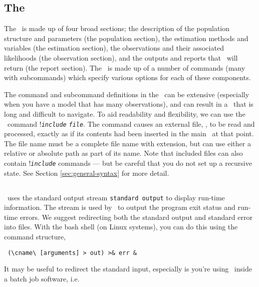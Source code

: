 \subsection{The \config\label{sec:config-files}}
\CH
The \config\ is made up of four broad sections; the description of the population structure and parameters (the population section), the estimation methods and variables (the estimation section), the observations and their associated likelihoods (the observation section), and the outputs and reports that \CNAME\ will return (the report section). The \config\ is made up of a number of commands (many with subcommands) which specify various options for each of these components.

The command and subcommand definitions in the \config\ can be extensive (especially when you have a model that has many observations), and can result in a \config\ that is long and difficult to navigate. To aid readability and flexibility, we can use the \config\ command !\texttt{\emph{include}} \texttt{\emph{file}}. The command causes an external file, , to be read and processed, exactly as if its contents had been inserted in the main \config\ at that point. The file name must be a complete file name with extension, but can use either a relative or absolute path as part of its name. Note that included files can also contain !\texttt{\emph{include}} commands --- but be careful that you do not set up a recursive state. See Section \ref{sec:general-syntax} for more detail.

\subsection{\label{sec:redirecting-stdout}}
\CH
\CNAME\ uses the standard output stream \texttt{standard output} to display run-time information. The  stream is used by \CNAME\ to output the program exit status and run-time errors. We suggest redirecting both the standard output and standard error into files. With the bash shell (on Linux systems), you can do this using the command structure,

\begin{verbatim} (\cname\ [arguments] > out) >& err &\end{verbatim}

It may be useful to redirect the standard input, especially is you're using \CNAME\ inside a batch job software, i.e. 

